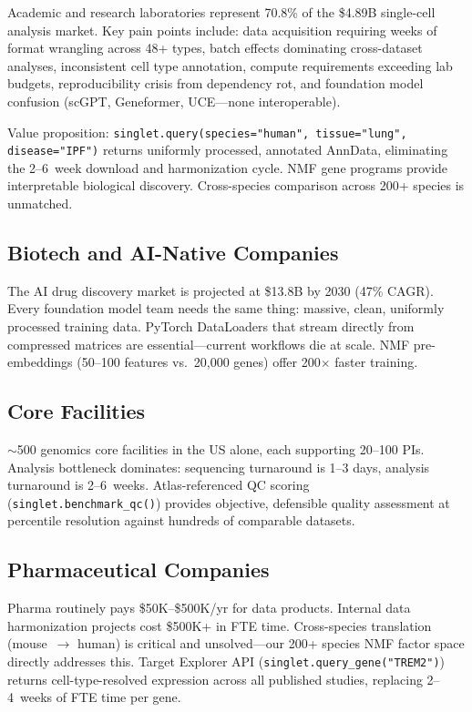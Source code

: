 \documentclass[10pt,twocolumn,letterpaper]{article}
\begin{document}
Academic and research laboratories represent 70.8\% of the \$4.89B single-cell
analysis market. Key pain points include: data acquisition requiring weeks of
format wrangling across 48+ types, batch effects dominating cross-dataset
analyses, inconsistent cell type annotation, compute requirements exceeding lab
budgets, reproducibility crisis from dependency rot, and foundation model
confusion (scGPT, Geneformer, UCE---none interoperable).

Value proposition: \texttt{singlet.query(species="human", tissue="lung",
disease="IPF")} returns uniformly processed, annotated AnnData, eliminating the
2--6~week download and harmonization cycle. NMF gene programs provide
interpretable biological discovery. Cross-species comparison across 200+ species
is unmatched.

\subsection{Biotech and AI-Native Companies}

The AI drug discovery market is projected at \$13.8B by 2030 (47\% CAGR). Every
foundation model team needs the same thing: massive, clean, uniformly processed
training data. PyTorch DataLoaders that stream directly from compressed matrices
are essential---current workflows die at scale. NMF pre-embeddings (50--100
features vs.\ 20,000 genes) offer 200$\times$ faster training.

\subsection{Core Facilities}

$\sim$500 genomics core facilities in the US alone, each supporting 20--100 PIs.
Analysis bottleneck dominates: sequencing turnaround is 1--3 days, analysis
turnaround is 2--6~weeks. Atlas-referenced QC scoring
(\texttt{singlet.benchmark\_qc()}) provides objective, defensible quality
assessment at percentile resolution against hundreds of comparable datasets.

\subsection{Pharmaceutical Companies}

Pharma routinely pays \$50K--\$500K/yr for data products. Internal data
harmonization projects cost \$500K+ in FTE time. Cross-species translation
(mouse~$\to$ human) is critical and unsolved---our 200+ species NMF factor space
directly addresses this. Target Explorer API
(\texttt{singlet.query\_gene("TREM2")}) returns cell-type-resolved expression
across all published studies, replacing 2--4~weeks of FTE time per gene.
\end{document}
